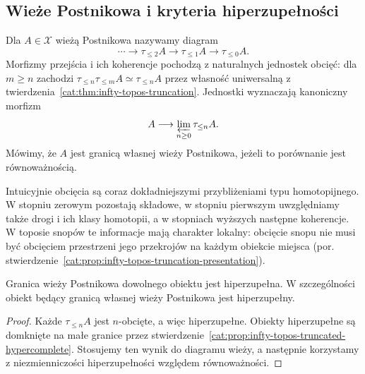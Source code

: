 \subsection{Wieże Postnikowa i kryteria hiperzupełności}

\begin{definicja}\label{cat:def:infty-topos-postnikov}
Dla $A\in\mathcal X$ wieżą Postnikowa nazywamy diagram
\[
 \cdots\longrightarrow\tau_{\leq2}A\longrightarrow
 \tau_{\leq1}A\longrightarrow\tau_{\leq0}A.
\]
Morfizmy przejścia i ich koherencje pochodzą z naturalnych jednostek obcięć: dla $m\geq n$ zachodzi $\tau_{\leq n}\tau_{\leq m}A\simeq\tau_{\leq n}A$ przez własność uniwersalną z twierdzenia~\ref{cat:thm:infty-topos-truncation}. Jednostki wyznaczają kanoniczny morfizm
\begin{equation}\label{cat:eq:infty-topos-postnikov-comparison}
 A\longrightarrow\varprojlim_{n\geq0}\tau_{\leq n}A.
\end{equation}
Mówimy, że $A$ jest granicą własnej wieży Postnikowa, jeżeli to porównanie jest równoważnością.
\end{definicja}

Intuicyjnie obcięcia są coraz dokładniejszymi przybliżeniami typu homotopijnego. W stopniu zerowym pozostają składowe, w stopniu pierwszym uwzględniamy także drogi i ich klasy homotopii, a w stopniach wyższych następne koherencje. W toposie snopów te informacje mają charakter lokalny: obcięcie snopu nie musi być obcięciem przestrzeni jego przekrojów na każdym obiekcie miejsca (por. stwierdzenie~\ref{cat:prop:infty-topos-truncation-presentation}).

\begin{stwierdzenie}\label{cat:prop:infty-topos-postnikov-hypercomplete}
Granica wieży Postnikowa dowolnego obiektu jest hiperzupełna. W szczególności obiekt będący granicą własnej wieży Postnikowa jest hiperzupełny.
\end{stwierdzenie}
\begin{proof}
Każde $\tau_{\leq n}A$ jest $n$-obcięte, a więc hiperzupełne. Obiekty hiperzupełne są domknięte na małe granice przez stwierdzenie~\ref{cat:prop:infty-topos-truncated-hypercomplete}. Stosujemy ten wynik do diagramu wieży, a następnie korzystamy z niezmienniczości hiperzupełności względem równoważności.
\end{proof}

